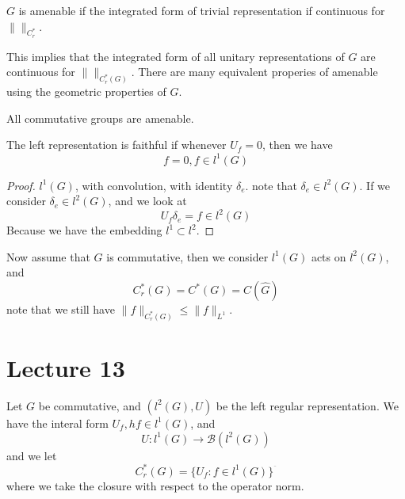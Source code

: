 \begin{definition}
    $G$ is amenable if the integrated form of trivial representation if continuous for $\|\|_{C_r^*}$.
\end{definition}
\begin{remark}
    This implies that the integrated form of all unitary representations of $G$ are continuous for $\| \|_{C_r^*(G)}$. There are many equivalent properies of amenable using the geometric properties of $G$.
\end{remark}
\begin{note}
    All commutative groups are amenable.
\end{note}

\begin{definition}
    The left representation is faithful if whenever $U_f=0$, then we have
    \begin{equation*}
        f=0, f\in l^1(G)
    \end{equation*}
\end{definition}
\begin{proof}
    $l^1(G)$, with convolution, with identity $\delta_e$. note that $\delta_e\in l^2(G)$. If we consider $\delta_e\in l^2(G)$, and we look at 
    \begin{equation*}
        U_f\delta_e=f\in l^2(G)
    \end{equation*}
    Because we have the embedding $l^1\subset l^2$. 
\end{proof}

Now assume that $G$ is commutative, then we consider $l^1(G)$ acts on $l^2(G)$, and 
\begin{equation*}
    C_r^*(G)=C^*(G)=C(\widehat{G})
\end{equation*}
note that we still have $\|f\|_{C_r^*(G)}\leq\|f\|_{L^1}$.

\section{Lecture 13}
Let $G$ be commutative, and $(l^2(G), U)$ be the left regular representation. We have the interal form $U_f, hf\in l^1(G)$, and 
\begin{equation*}
    U: l^1(G)\to \mathcal{B}(l^2(G))
\end{equation*}
and we let
\begin{equation*}
    C_r^*(G)=\{U_f: f\in l^1(G)\}^{\overline{\phantom{.}}}
\end{equation*}
where we take the closure with respect to the operator norm.

